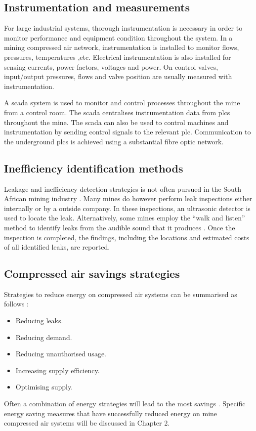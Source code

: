 		\subsection{Instrumentation and measurements}
		For large industrial systems, thorough instrumentation is necessary in order to monitor performance and equipment condition throughout the system. In a mining compressed air network, instrumentation is installed to monitor flows, pressures, temperatures ,etc. Electrical instrumentation is also installed for sensing currents, power factors, voltages and power. On control valves, input/output pressures, flows and valve position are usually measured with instrumentation.	
		\par
		 A \gls{scada} system is used to monitor and control processes throughout the mine from a control room. The \gls{scada} centralises instrumentation data from \glspl{plc} throughout the mine. The \gls{scada} can also be used to control machines and instrumentation by sending control signals to the relevant \gls{plc}.  Communication to the underground \glspl{plc} is achieved using a substantial fibre optic network.\cite{schroeder2009energy}

	\subsection{Inefficiency identification methods}
		Leakage and inefficiency detection strategies is not often pursued in the South African mining industry \cite{vanTonder2010Masters}. Many mines do however perform leak inspections either internally or by a outside company. In these inspections, an ultrasonic detector is used to locate the leak. Alternatively, some mines employ the \enquote{walk and listen} method to identify leaks from the audible sound that it produces \cite{vanTonder2010Masters}. Once the inspection is completed, the findings, including the locations and estimated costs of all identified leaks, are reported.
	\subsection{Compressed air savings strategies}
		Strategies to reduce energy on compressed air systems can be summarised as follows \cite{Snyman2011Masters}:
		\begin{itemize}
			\item Reducing leaks.
			\item Reducing demand.
			\item Reducing unauthorised usage.
			\item Increasing supply efficiency.
			\item Optimising supply.
		\end{itemize}
	Often a combination of energy strategies will lead to the most savings \cite{Marais2012PhD}. Specific energy saving measures that have successfully reduced energy on mine compressed air systems will be discussed in Chapter 2.
\clearpage
